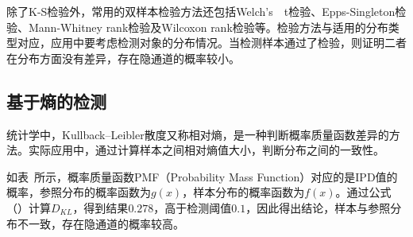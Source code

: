 除了K-S检验外，常用的双样本检验方法还包括{Welch's\ \ t检验}、Epps-Singleton检验、Mann-Whitney rank检验及Wilcoxon rank检验等。检验方法与适用的分布类型对应，应用中要考虑检测对象的分布情况。当检测样本通过了检验，则证明二者在分布方面没有差异，存在隐通道的概率较小。

\subsection{基于熵的检测}
\label{chap:backinfo:detect:entropy}

统计学中，Kullback–Leibler散度又称相对熵，是一种判断概率质量函数差异的方法。实际应用中，通过计算样本之间相对熵值大小，判断分布之间的一致性。

如表\ 所示，概率质量函数PMF（Probability Mass Function）对应的是IPD值的概率，参照分布的概率函数为$g(x)$，样本分布的概率函数为$f(x)$。通过公式（）计算$D_{KL}$，得到结果$0.278$，高于检测阈值$0.1$，因此得出结论，样本与参照分布不一致，存在隐通道的概率较高。


